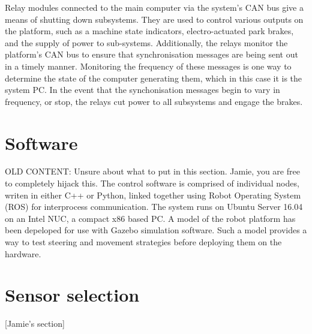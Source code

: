 \documentclass[preprint,authoryear,12pt]{elsarticle}
\begin{document}
    Relay modules connected to the main computer via the system's CAN bus give a means of shutting down subsystems.
    They are used to control various outputs on the platform, such as a machine state indicators, electro-actuated park brakes, and the supply of power to sub-systems. 
    Additionally, the relays monitor the platform's CAN bus to ensure that synchronisation messages are being sent out in a timely manner.
    Monitoring the frequency of these messages is one way to determine the state of the computer generating them, which in this case it is the system PC.
    In the event that the synchonisation messages begin to vary in frequency, or stop, the relays cut power to all subsystems and engage the brakes.


\section{Software}
\label{sect:software}
    \color{red}
        OLD CONTENT: Unsure about what to put in this section. Jamie, you are free to completely hijack this.
    \color{black}
    The control software is comprised of individual nodes, writen in either C++ or Python, linked together using Robot Operating System (ROS) for interprocess communication.
    The system runs on Ubuntu Server 16.04 on an Intel NUC, a compact x86 based PC.
    A model of the robot platform has been depeloped for use with Gazebo simulation software.
    Such a model provides a way to test steering and movement strategies before deploying them on the hardware.

\section{Sensor selection}
\label{sect:sensors}
    [Jamie's section]
\end{document}
